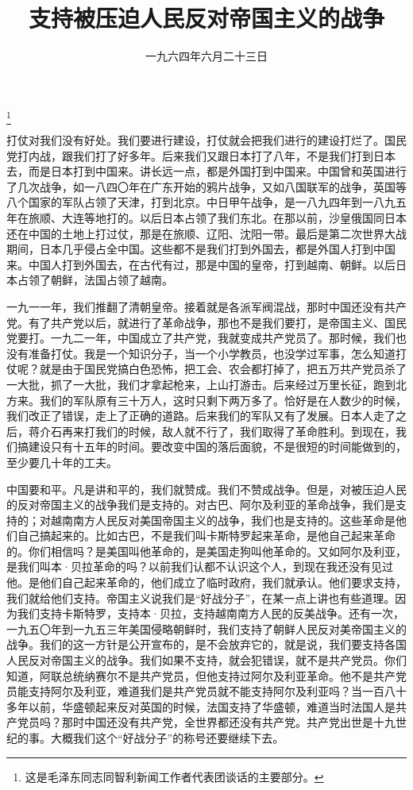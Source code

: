 
\title{支持被压迫人民反对帝国主义的战争}
\date{一九六四年六月二十三日}
\thanks{这是毛泽东同志同智利新闻工作者代表团谈话的主要部分。}
\maketitle


打仗对我们没有好处。我们要进行建设，打仗就会把我们进行的建设打烂了。国民党打内战，跟我们打了好多年。后来我们又跟日本打了八年，不是我们打到日本去，而是日本打到中国来。讲长远一点，都是外国打到中国来。中国曾和英国进行了几次战争，如一八四〇年在广东开始的鸦片战争，又如八国联军的战争，英国等八个国家的军队占领了天津，打到北京。中日甲午战争，是一八九四年到一八九五年在旅顺、大连等地打的。以后日本占领了我们东北。在那以前，沙皇俄国同日本还在中国的土地上打过仗，那是在旅顺、辽阳、沈阳一带。最后是第二次世界大战期间，日本几乎侵占全中国。这些都不是我们打到外国去，都是外国人打到中国来。中国人打到外国去，在古代有过，那是中国的皇帝，打到越南、朝鲜。以后日本占领了朝鲜，法国占领了越南。

一九一一年，我们推翻了清朝皇帝。接着就是各派军阀混战，那时中国还没有共产党。有了共产党以后，就进行了革命战争，那也不是我们要打，是帝国主义、国民党要打。一九二一年，中国成立了共产党，我就变成共产党员了。那时候，我们也没有准备打仗。我是一个知识分子，当一个小学教员，也没学过军事，怎么知道打仗呢？就是由于国民党搞白色恐怖，把工会、农会都打掉了，把五万共产党员杀了一大批，抓了一大批，我们才拿起枪来，上山打游击。后来经过万里长征，跑到北方来。我们的军队原有三十万人，这时只剩下两万多了。恰好是在人数少的时候，我们改正了错误，走上了正确的道路。后来我们的军队又有了发展。日本人走了之后，蒋介石再来打我们的时候，敌人就不行了，我们取得了革命胜利。到现在，我们搞建设只有十五年的时间。要改变中国的落后面貌，不是很短的时间能做到的，至少要几十年的工夫。

中国要和平。凡是讲和平的，我们就赞成。我们不赞成战争。但是，对被压迫人民的反对帝国主义的战争我们是支持的。对古巴、阿尔及利亚的革命战争，我们是支持的；对越南南方人民反对美国帝国主义的战争，我们也是支持的。这些革命是他们自己搞起来的。比如古巴，不是我们叫卡斯特罗起来革命，是他自己起来革命的。你们相信吗？是美国叫他革命的，是美国走狗叫他革命的。又如阿尔及利亚，是我们叫本·贝拉革命的吗？以前我们认都不认识这个人，到现在我还没有见过他。是他们自己起来革命的，他们成立了临时政府，我们就承认。他们要求支持，我们就给他们支持。帝国主义说我们是“好战分子”，在某一点上讲也有些道理。因为我们支持卡斯特罗，支持本·贝拉，支持越南南方人民的反美战争。还有一次，一九五〇年到一九五三年美国侵略朝鲜时，我们支持了朝鲜人民反对美帝国主义的战争。我们的这一方针是公开宣布的，是不会放弃它的，就是说，我们要支持各国人民反对帝国主义的战争。我们如果不支持，就会犯错误，就不是共产党员。你们知道，阿联总统纳赛尔不是共产党员，但他支持过阿尔及利亚革命。他不是共产党员能支持阿尔及利亚，难道我们是共产党员就不能支持阿尔及利亚吗？当一百八十多年以前，华盛顿起来反对英国的时候，法国支持了华盛顿，难道当时法国人是共产党员吗？那时中国还没有共产党，全世界都还没有共产党。共产党出世是十九世纪的事。大概我们这个“好战分子”的称号还要继续下去。

